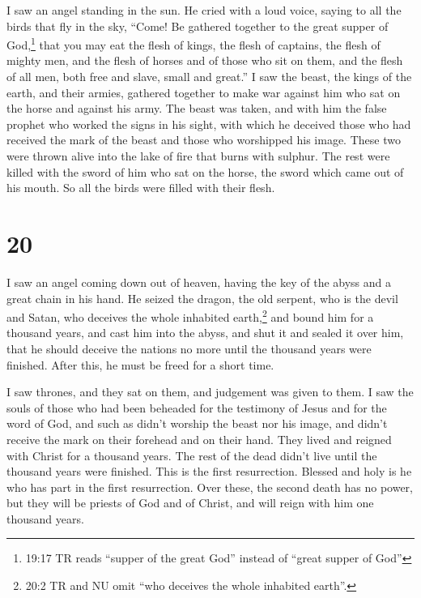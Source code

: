  I saw an angel standing in the sun. He cried with a loud
voice, saying to all the birds that fly in the sky, ``Come! Be gathered
together to the great supper of God,\footnote{19:17 TR reads ``supper of
  the great God'' instead of ``great supper of God''}  that
you may eat the flesh of kings, the flesh of captains, the flesh of
mighty men, and the flesh of horses and of those who sit on them, and
the flesh of all men, both free and slave, small and great.''
 I saw the beast, the kings of the earth, and their armies,
gathered together to make war against him who sat on the horse and
against his army.  The beast was taken, and with him the
false prophet who worked the signs in his sight, with which he deceived
those who had received the mark of the beast and those who worshipped
his image. These two were thrown alive into the lake of fire that burns
with sulphur.  The rest were killed with the sword of him
who sat on the horse, the sword which came out of his mouth. So all the
birds were filled with their flesh.

\hypertarget{section-19}{%
\section{20}\label{section-19}}

 I saw an angel coming down out of heaven, having the key of
the abyss and a great chain in his hand.  He seized the
dragon, the old serpent, who is the devil and Satan, who deceives the
whole inhabited earth,\footnote{20:2 TR and NU omit ``who deceives the
  whole inhabited earth''.} and bound him for a thousand years,
 and cast him into the abyss, and shut it and sealed it over
him, that he should deceive the nations no more until the thousand years
were finished. After this, he must be freed for a short time.

 I saw thrones, and they sat on them, and judgement was
given to them. I saw the souls of those who had been beheaded for the
testimony of Jesus and for the word of God, and such as didn't worship
the beast nor his image, and didn't receive the mark on their forehead
and on their hand. They lived and reigned with Christ for a thousand
years.  The rest of the dead didn't live until the thousand
years were finished. This is the first resurrection. 
Blessed and holy is he who has part in the first resurrection. Over
these, the second death has no power, but they will be priests of God
and of Christ, and will reign with him one thousand years.

